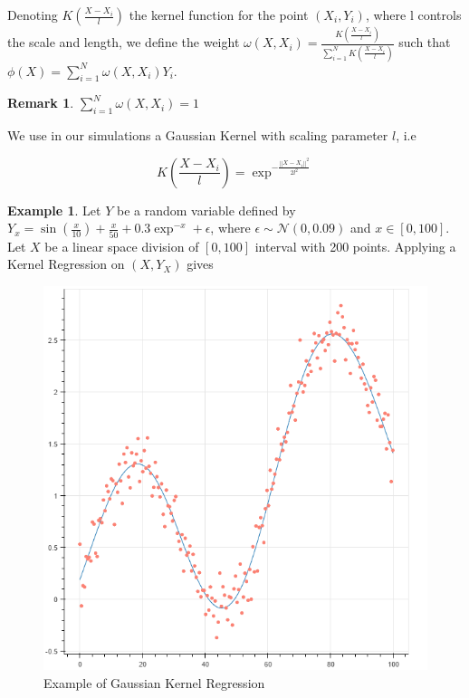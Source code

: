\documentclass[english,11pt,openany]{report}
\theoremstyle{definition}
\theoremstyle{plain}
\theoremstyle{definition}
\newtheorem{Rem}[Th]{Remark}
\newtheorem{Ex}[Th]{Example}
\begin{document}
\noindent
Denoting $K\left(\frac{X - X_i}{l}\right)$ the kernel function for the point $(X_i, Y_i)$, where l controls the scale and length,  we define the weight $\omega(X, X_i) = \frac{K(\frac{X - X_i}{l})}{\sum_{i=1}^{N} K(\frac{X - X_i}{l})}$ such that $\phi(X) = \sum_{i=1}^{N} \omega(X, X_i)Y_i$. 

\begin{Rem}
	$\sum_{i=1}^{N} \omega(X, X_i) = 1$
\end{Rem}

\noindent
We use in our simulations a Gaussian Kernel with scaling parameter $l$, i.e 

\begin{displaymath}
K\left(\frac{X - X_i}{l}\right) = \exp^{- \frac{||X - X_i||^2}{2l^2}}
\end{displaymath} 


\begin{Ex}	
	Let $Y$ be a random variable defined by $Y_x = \sin(\frac{x}{10}) + \frac{x}{50} + 0.3 \exp^{-x} + \epsilon$, where $\epsilon \sim \mathcal{N}(0, 0.09)$ and $x \in \left[0, 100\right]$.
	Let $X$ be a linear space division of $\left[0, 100\right]$ interval with 200 points.
	Applying a Kernel Regression on $\left(X, Y_X\right)$ gives
	
	\begin{figure}[H]
		\begin{center}
			\includegraphics[scale=0.5]{kernel_regression/example.png} 
			\caption{Example of Gaussian Kernel Regression}
		\end{center}
	\end{figure}
	\newpage
\end{Ex}
\end{document}
